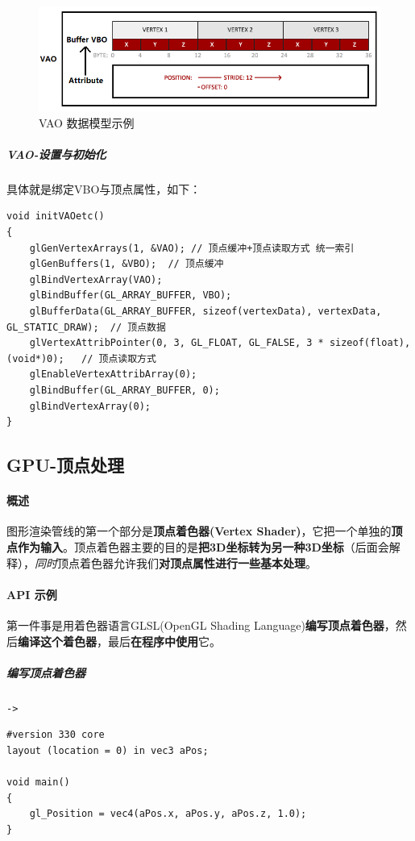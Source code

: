 \documentclass[UTF8,a4paper,12pt]{ctexbook}
\begin{document}
					
					\begin{figure}[H]
						\centering
						\includegraphics[width=\linewidth]{VBO_Attr}
						\caption{VAO 数据模型示例}
					\end{figure}
					
				\subparagraph{VAO-设置与初始化}		
					具体就是绑定VBO与顶点属性，如下：
					\begin{lstlisting}
void initVAOetc()
{
	glGenVertexArrays(1, &VAO);	// 顶点缓冲+顶点读取方式 统一索引
	glGenBuffers(1, &VBO);	// 顶点缓冲
	glBindVertexArray(VAO);
	glBindBuffer(GL_ARRAY_BUFFER, VBO);
	glBufferData(GL_ARRAY_BUFFER, sizeof(vertexData), vertexData, GL_STATIC_DRAW);	// 顶点数据
	glVertexAttribPointer(0, 3, GL_FLOAT, GL_FALSE, 3 * sizeof(float), (void*)0);	// 顶点读取方式
	glEnableVertexAttribArray(0);
	glBindBuffer(GL_ARRAY_BUFFER, 0);
	glBindVertexArray(0);
}					
					\end{lstlisting}
							
		\subsection{GPU-顶点处理}
			\paragraph{概述}		
				图形渲染管线的第一个部分是\textbf{顶点着色器(Vertex Shader)}，它把一个单独的\textbf{顶点作为输入}。顶点着色器主要的目的是\textbf{把3D坐标转为另一种3D坐标}（后面会解释），\textit{同时}顶点着色器允许我们\textbf{对顶点属性进行一些基本处理}。
			
			\paragraph{API 示例}
				第一件事是用着色器语言GLSL(OpenGL Shading Language)\textbf{编写顶点着色器}，然后\textbf{编译这个着色器}，最后\textbf{在程序中使用}它。
				
				\subparagraph{编写顶点着色器}\verb|->|
				
					\begin{lstlisting}
#version 330 core
layout (location = 0) in vec3 aPos;

void main()
{
    gl_Position = vec4(aPos.x, aPos.y, aPos.z, 1.0);
}				
					\end{lstlisting}
					
\end{document}
